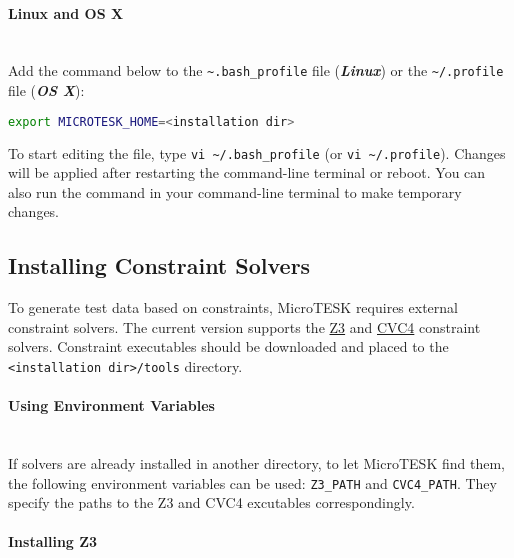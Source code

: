 \documentclass[oneside,final,12pt]{extreport}
\begin{document}
\paragraph{Linux and OS X} ~\\

Add the command below to the \texttt{\textasciitilde{}.bash{\_}profile} file
(\textbf{\textit{Linux}}) or the \texttt{\textasciitilde{}/.profile} file (\textbf{\textit{OS X}}):

\begin{lstlisting}[language=bash]
export MICROTESK_HOME=<installation dir>
\end{lstlisting}

To start editing the file, type \texttt{vi \textasciitilde{}/.bash{\_}profile}
(or \texttt{vi \textasciitilde{}/.profile}).
Changes will be applied after restarting the command-line terminal or reboot. You can also
run the command in your command-line terminal to make temporary changes.


\subsection{Installing Constraint Solvers}
\label{Installing_Constraint_Solvers}

To generate test data based on constraints, MicroTESK requires external constraint solvers.
The current version supports the \href{https://github.com/z3prover}{Z3} and
\href{http://cvc4.cs.nyu.edu}{CVC4} constraint solvers. Constraint executables should be
downloaded and placed to the \texttt{<installation dir>/tools} directory.

\paragraph{Using Environment Variables} ~\\

If solvers are already installed in another directory, to let MicroTESK find them, the following
environment variables can be used: \texttt{Z3{\_}PATH} and \texttt{CVC4{\_}PATH}. They specify
the paths to the Z3 and CVC4 excutables correspondingly.

\paragraph{Installing Z3}
\end{document}
